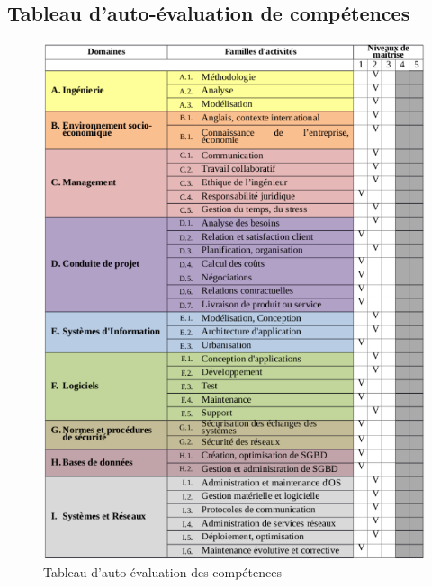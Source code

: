 \documentclass[12pt,a4paper]{report}
\begin{document}
\begin{appendix}
\chapter{Tableau d'auto-évaluation de compétences}
\begin{figure}[!ht]
    \center
    \includegraphics[scale=0.9]{./img/tableaux_cpt.PNG}
    \caption{Tableau d'auto-évaluation des compétences}
\end{figure}

\end{appendix}

\newpage
\printnoidxglossary[type=main]
\end{document}
